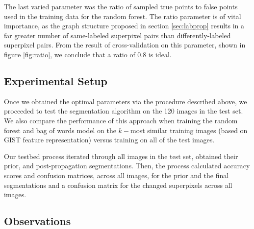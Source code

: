 \documentclass{article} %
\begin{document}
The last varied parameter was the ratio of sampled true points to false points used in the training data for the random forest.
The ratio parameter is of vital importance, as the graph structure proposed in section \ref{sec:labprop} results in a far greater number of same-labeled superpixel pairs than differently-labeled superpixel pairs.
From the result of cross-validation on this parameter, shown in figure \ref{fig:ratio}, we conclude that a ratio of 0.8 is ideal.


\subsection{Experimental Setup}

Once we obtained the optimal parameters via the procedure described above, we proceeded to test the segmentation algorithm on the 120 images in the test set. We also compare the performance of this approach when training the random forest and bag of words model on the $k-$most similar training images (based on GIST feature representation) versus training on all of the test images.

Our testbed process iterated through all images in the test set, obtained their prior, and post-propagation segmentations. Then, the process calculated accuracy scores and confusion matrices, across all images, for the prior and the final segmentations and a confusion matrix for the changed superpixels across all images. 

\subsection{Observations}
\label{sec:Observations}
\end{document}
